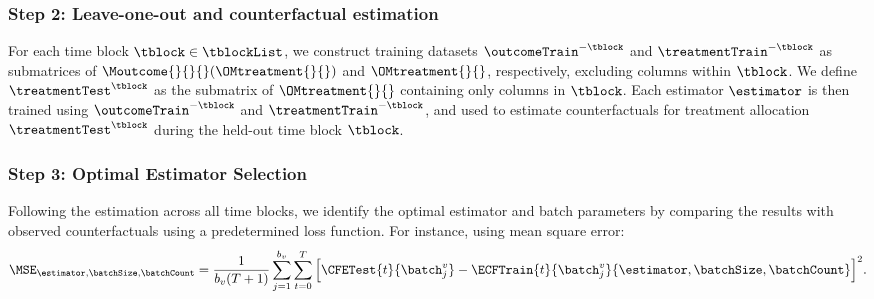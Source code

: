 \subsubsection*{Step 2: Leave-one-out and counterfactual estimation}
% 
For each time block $\tblock\in\tblockList$, we construct training datasets $\outcomeTrain^{-\tblock}$ and $\treatmentTrain^{-\tblock}$ as submatrices of $\Moutcome{}{}{}(\OMtreatment{}{})$ and $\OMtreatment{}{}$, respectively, excluding columns within $\tblock$. We define $\treatmentTest^{\tblock}$ as the submatrix of $\OMtreatment{}{}$ containing only columns in $\tblock$. Each estimator $\estimator$ is then trained using $\outcomeTrain^{-\tblock}$ and $\treatmentTrain^{-\tblock}$, and used to estimate counterfactuals for treatment allocation $\treatmentTest^{\tblock}$ during the held-out time block $\tblock$.

\subsubsection*{Step 3: Optimal Estimator Selection}
% 
Following the estimation across all time blocks, we identify the optimal estimator and batch parameters by comparing the results with observed counterfactuals using a predetermined loss function. For instance, using mean square error:
% 
\begin{align*}
    \MSE_{\estimator,\batchSize,\batchCount}
    =
    \frac{1}{b_v (T+1)}
    \sum_{j=1}^{b_v}
    \sum_{t=0}^T
    \Big[\CFETest{t}{\batch_{j}^v} - 
    \ECFTrain{t}{\batch_{j}^v}{\estimator,\batchSize,\batchCount}
    \Big]^2.
\end{align*}
%

